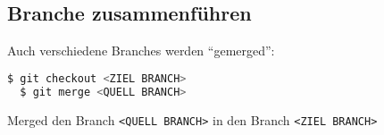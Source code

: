 \documentclass[landscape,a4paper]{cheatsheet}
\begin{document}
\subsection{Branche zusammenführen}
Auch verschiedene Branches werden \enquote{gemerged}:
\begin{lstlisting}[language=bash]
  $ git checkout <ZIEL BRANCH>
  $ git merge <QUELL BRANCH>
\end{lstlisting} %
Merged den Branch \lstinline{<QUELL BRANCH>} in den Branch
\lstinline{<ZIEL BRANCH>}
\end{document}
